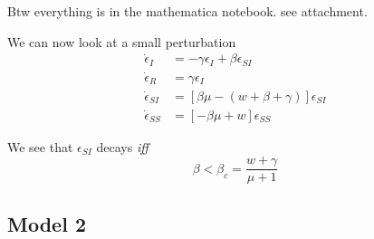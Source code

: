 \documentclass[a4paper,10pt]{article}
\begin{document}
Btw everything is in the mathematica notebook. see attachment.

We can now look at a small perturbation 
\begin{align}
\dot \epsilon_I &= -\gamma \epsilon_I +\beta \epsilon_{SI}\\
\dot \epsilon_R &= \gamma \epsilon_I \\
\dot \epsilon_{SI} &= [\beta\mu - (w+\beta+\gamma)]\epsilon_{SI}\\
\dot \epsilon_{SS} &= [-\beta\mu+w]\epsilon_{SS}
\end{align}

We see that $\epsilon_{SI}$ decays \textit{iff}
\begin{equation}
 \beta<\beta_c=\frac{w+\gamma}{\mu+1}
\end{equation}


\subsection{Model 2}


\end{document}
